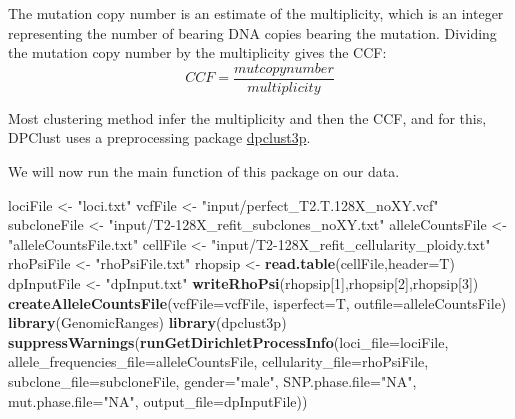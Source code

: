 \documentclass[]{article}
\newenvironment{Shaded}{\begin{snugshade}}{\end{snugshade}}
\newcommand{\DataTypeTok}[1]{\textcolor[rgb]{0.13,0.29,0.53}{#1}}
\newcommand{\DecValTok}[1]{\textcolor[rgb]{0.00,0.00,0.81}{#1}}
\newcommand{\KeywordTok}[1]{\textcolor[rgb]{0.13,0.29,0.53}{\textbf{#1}}}
\newcommand{\NormalTok}[1]{#1}
\newcommand{\StringTok}[1]{\textcolor[rgb]{0.31,0.60,0.02}{#1}}
\begin{document}
The mutation copy number is an estimate of the multiplicity, which is an
integer representing the number of bearing DNA copies bearing the
mutation. Dividing the mutation copy number by the multiplicity gives
the CCF: \[CCF=\frac{mutcopynumber}{multiplicity}\]

Most clustering method infer the multiplicity and then the CCF, and for
this, DPClust uses a preprocessing package
\href{https://github.com/Wedge-Oxford/dpclust_smchet_docker/blob/master/dpclust3p_v1.0.6.tar.gz}{dpclust3p}.

We will now run the main function of this package on our data.

\begin{Shaded}
\begin{Highlighting}[]
\NormalTok{lociFile  <-}\StringTok{ "loci.txt"}
\NormalTok{vcfFile <-}\StringTok{ "input/perfect_T2.T.128X_noXY.vcf"}
\NormalTok{subcloneFile <-}\StringTok{ "input/T2-128X_refit_subclones_noXY.txt"}
\NormalTok{alleleCountsFile <-}\StringTok{ "alleleCountsFile.txt"}
\NormalTok{cellFile <-}\StringTok{ "input/T2-128X_refit_cellularity_ploidy.txt"}
\NormalTok{rhoPsiFile <-}\StringTok{ "rhoPsiFile.txt"}
\NormalTok{rhopsip <-}\StringTok{ }\KeywordTok{read.table}\NormalTok{(cellFile,}\DataTypeTok{header=}\NormalTok{T)}
\NormalTok{dpInputFile <-}\StringTok{ "dpInput.txt"}
\KeywordTok{writeRhoPsi}\NormalTok{(rhopsip[}\DecValTok{1}\NormalTok{],rhopsip[}\DecValTok{2}\NormalTok{],rhopsip[}\DecValTok{3}\NormalTok{])}
\KeywordTok{createAlleleCountsFile}\NormalTok{(}\DataTypeTok{vcfFile=}\NormalTok{vcfFile, }\DataTypeTok{isperfect=}\NormalTok{T, }\DataTypeTok{outfile=}\NormalTok{alleleCountsFile)}
\KeywordTok{library}\NormalTok{(GenomicRanges)}
\KeywordTok{library}\NormalTok{(dpclust3p)}
\KeywordTok{suppressWarnings}\NormalTok{(}\KeywordTok{runGetDirichletProcessInfo}\NormalTok{(}\DataTypeTok{loci_file=}\NormalTok{lociFile,}
                                            \DataTypeTok{allele_frequencies_file=}\NormalTok{alleleCountsFile,}
                                            \DataTypeTok{cellularity_file=}\NormalTok{rhoPsiFile,}
                                            \DataTypeTok{subclone_file=}\NormalTok{subcloneFile,}
                                            \DataTypeTok{gender=}\StringTok{"male"}\NormalTok{,}
                                            \DataTypeTok{SNP.phase.file=}\StringTok{"NA"}\NormalTok{,}
                                            \DataTypeTok{mut.phase.file=}\StringTok{"NA"}\NormalTok{,}
                                            \DataTypeTok{output_file=}\NormalTok{dpInputFile))}
\end{Highlighting}
\end{Shaded}
\end{document}
